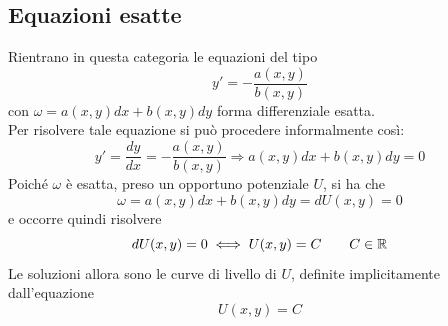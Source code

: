 \subsection{Equazioni esatte}
Rientrano in questa categoria le equazioni del tipo
\begin{equation*}
    y'=-\frac{a(x,y)}{b(x,y)}
\end{equation*}
con $\omega=a(x,y)dx+b(x,y)dy$ forma differenziale esatta.\\
Per risolvere tale equazione si può procedere informalmente così:
\begin{equation*}
    y'=\frac{dy}{dx}=-\frac{a(x,y)}{b(x,y)} \Rightarrow a(x,y)dx+b(x,y)dy=0
\end{equation*}
Poiché $\omega$ è esatta, preso un opportuno potenziale $U$, si ha che
\begin{equation*}
\omega= a(x,y)dx+b(x,y)dy = dU(x,y)= 0
\end{equation*}
e occorre quindi risolvere
\begin{equation*}
    dU(x,y)=0 \iff U(x,y)=C \qquad C\in \mathbb{R}
\end{equation*}
Le soluzioni allora sono le curve di livello di $U$, definite implicitamente dall'equazione
\begin{equation*}
    U(x,y)=C
\end{equation*}
